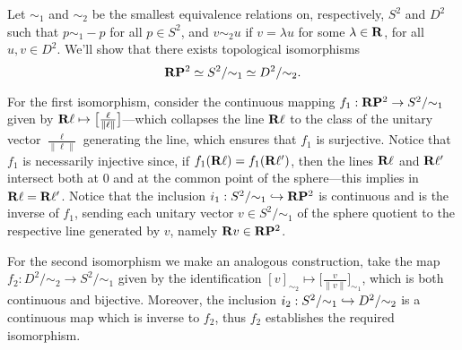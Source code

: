 


\begin{example}
\label{exp:RP2-iso-S2-D2}
Let \(\sim_1\) and \(\sim_2\) be the smallest equivalence relations on,
respectively, \(S^2\) and \(D^2\) such that \(p \sim_1 -p\) for all
\(p \in S^2\), and \(v \sim_2 u\) if \(v = \lambda u\) for some
\(\lambda \in \mathbf{R}\), for all \(u, v \in D^2\). We'll show that there exists
topological isomorphisms
\[
\mathbf{R} \mathbf{P}^2 \simeq S^2/{\sim_1} \simeq D^2/{\sim_2}.
\]

For the first isomorphism, consider the continuous mapping
\(f_1: \mathbf{R} \mathbf{P}^2 \to S^2/{\sim_1}\) given by
\(\mathbf{R} \ell \mapsto \big[ \frac{\ell}{\| \ell \|}\big]\)---which collapses the
line \(\mathbf{R} \ell\) to the class of the unitary vector \(\frac{\ell}{\| \ell \|}\)
generating the line, which ensures that \(f_1\) is surjective. Notice that
\(f_1\) is necessarily injective since, if \(f_1(\mathbf{R} \ell) = f_1(\mathbf{R} \ell')\),
then the lines \(\mathbf{R} \ell\) and \(\mathbf{R} \ell'\) intersect both at \(0\) and at the
common point of the sphere---this implies in \(\mathbf{R} \ell = \mathbf{R} \ell'\). Notice
that the inclusion \(i_1: S^2/{\sim_1} \hookrightarrow \mathbf{R} \mathbf{P}^2\) is continuous and is
the inverse of \(f_1\), sending each unitary vector \(v \in S^2/{\sim_1}\) of
the sphere quotient to the respective line generated by \(v\), namely
\(\mathbf{R} v \in \mathbf{R} \mathbf{P}^2\).

For the second isomorphism we make an analogous construction, take the map
\(f_2: D^2/{\sim_2} \to S^2/{\sim_1}\) given by the identification
\([v]_{\sim_2} \mapsto \big[ \frac{v}{\| v \|} \big]_{\sim_1}\), which is both
continuous and bijective. Moreover, the inclusion
\(i_2: S^2/{\sim_1} \hookrightarrow D^2/{\sim_2}\) is a continuous map which is inverse to
\(f_2\), thus \(f_2\) establishes the required isomorphism.
\end{example}


